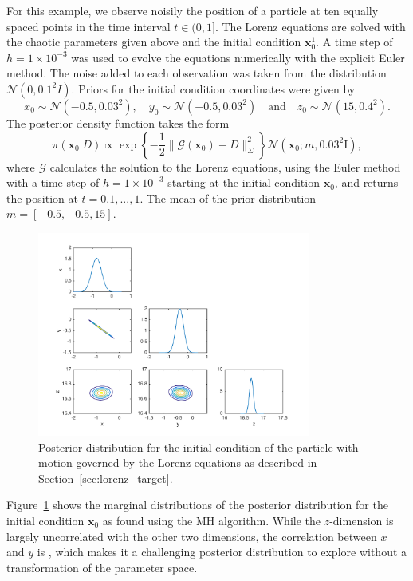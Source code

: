 \documentclass[final]{siamltex}
\begin{document}
For this example, we observe noisily the position of a particle at ten
equally spaced points in the time interval $t \in (0, 1]$. The Lorenz
equations are solved with the chaotic parameters given above and the
initial condition $\mathbf{x}_0^1$. A time step of $h=1\times 10^{-3}$
was used to evolve the equations numerically with the explicit Euler
method. The noise added to each observation was taken from the
distribution {\red $\mathcal{N}(0, 0.1^2I)$.} Priors for the initial condition
coordinates were given by
\[
	x_0 \sim \mathcal{N}(-0.5, 0.03^2), \quad y_0 \sim\mathcal{N}(-0.5, 0.03^2) \quad \text{and} \quad z_0 \sim \mathcal{N}(15, 0.4^2).
\]
The posterior density function takes the form
\[
	\pi(\mathbf{x}_0|D) \propto \exp\left\{-\frac{1}{2}\|\mathcal{G}(\mathbf{x}_0) - D\|^2_\Sigma\right\}\mathcal{N}(\mathbf{x}_0; m, 0.03^2\text{I}),
\]
where $\mathcal{G}$ calculates the solution to the Lorenz equations, using the Euler method with a time step of $h=1\times 10^{-3}$ starting at the initial condition $\mathbf{x}_0$, and returns the position at $t = 0.1, ..., 1$. The mean of the prior distribution $m = [-0.5, -0.5, 15]$.


\begin{figure}[htb]
\centering
\includegraphics[width=0.8\textwidth]{"figures/Lorenz_posterior_b"}
\caption{Posterior distribution for the initial condition of the particle with motion governed by the Lorenz equations as described in Section~\ref{sec:lorenz_target}.}
\label{fig:Lorenz_posterior}
\end{figure}

Figure~\ref{fig:Lorenz_posterior} shows the marginal distributions of
the posterior distribution for the initial condition $\mathbf{x}_0$ as
found using the MH algorithm. While the $z$-dimension is largely
uncorrelated with the other two dimensions, the correlation between
$x$ and $y$ is {}, which makes it a challenging posterior distribution to explore without a transformation of the parameter space.
\end{document}

